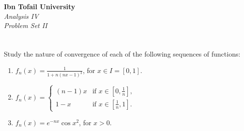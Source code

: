 \documentclass[12pt]{article}
\begin{document}
\begin{center}
\Large\textbf{Ibn Tofail University} \\[1em]
\large\textit{Analysis IV} \\[2em]
\large\textit{Problem Set II} \\[0.5em]
\end{center}

\vspace{1cm}

\section{}
Study the nature of convergence of each of the following sequences of functions:

\begin{enumerate}
    \item $f_n(x) = \frac{1}{1+n(nx-1)^2}$, for $x \in I = [0, 1]$.
    \item $f_n(x) = \begin{cases}
            (n-1)x & \text{if } x \in \left[0, \frac{1}{n}\right], \\
            1-x & \text{if } x \in \left[\frac{1}{n}, 1\right].
        \end{cases}$
    \item $f_n(x) = e^{-nx}\cos x^2$, for $x > 0$.
\end{enumerate}
\end{document}
